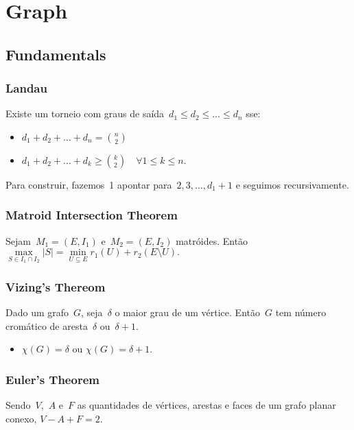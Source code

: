 \chapter{Graph}

\section{Fundamentals}
    \newline
    \newline
    
\subsection{Landau}
Existe um torneio com graus de saída~$d_1 \leq d_2 \leq \ldots \leq d_n$ sse:
\begin{itemize}
\item $d_1 + d_2 + \ldots + d_n = {n \choose 2}$\\
\item $d_1 + d_2 + \ldots + d_k \geq {k \choose 2} \quad \forall 1 \leq k \leq n.$
\end{itemize}
Para construir, fazemos~1 apontar para~$2, 3, \ldots, d_1 + 1$ e seguimos recursivamente.

\subsection{Matroid Intersection Theorem}
Sejam~$M_1 = (E, I_1)$ e~$M_2 = (E, I_2)$ matróides. Então
$ \max\limits_{S \in I_1 \cap I_2}{|S|} = \min\limits_{U \subseteq E}{r_1(U) + r_2(E \setminus U)}. $

\subsection{Vizing's Thereom}
Dado um grafo~$G$, seja~$\delta$ o maior grau de um vértice. Então~$G$ tem número cromático de aresta~$\delta$ ou~$\delta + 1$.
\begin{itemize}
\item $\chi(G) = \delta $ ou $\chi(G) = \delta + 1$.
\end{itemize}	

\subsection{Euler's Theorem}
Sendo~$V$,~$A$ e~$F$ as quantidades de vértices, arestas e faces de um grafo planar conexo,
$ V - A + F = 2 $.

